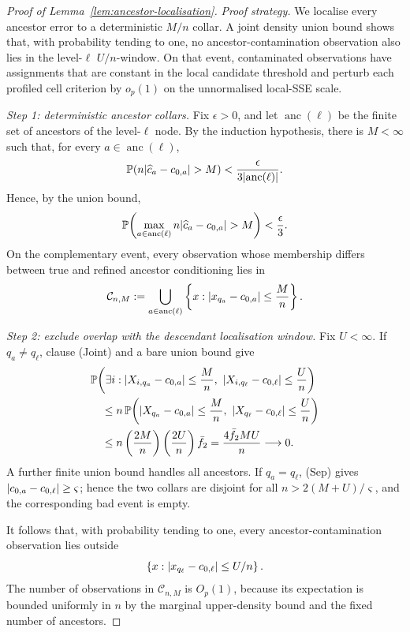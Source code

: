 \documentclass[11pt]{article}
\theoremstyle{plain}
\theoremstyle{definition}
\theoremstyle{remark}
\newcommand{\PP}{\mathbb{P}}
\DeclarePairedDelimiter{\abs}{\lvert}{\rvert}
\DeclarePairedDelimiter{\card}{\lvert}{\rvert}
\begin{document}
\begin{proof}[Proof of Lemma~\ref{lem:ancestor-localisation}]
\emph{Proof strategy.}
We localise every ancestor error to a deterministic \(M/n\) collar.  A joint
density union bound shows that, with probability tending to one, no
ancestor-contamination observation also lies in the level-\(\ell\)
\(U/n\)-window.  On that event, contaminated observations have assignments
that are constant in the local candidate threshold and perturb each profiled
cell criterion by \(o_p(1)\) on the unnormalised local-SSE scale.

\emph{Step 1: deterministic ancestor collars.}
Fix \(\epsilon>0\), and let
\(\operatorname{anc}(\ell)\) be the finite set of ancestors of the
level-\(\ell\) node.  By the induction hypothesis, there is \(M<\infty\) such
that, for every \(a\in\operatorname{anc}(\ell)\),
\[
  \PP\!\left(
    n\abs{\widehat c_a-c_{0,a}}>M
  \right)
  <
  \frac{\epsilon}
       {3\card{\operatorname{anc}(\ell)}}.
\]
Hence, by the union bound,
\[
  \PP\!\left(
    \max_{a\in\operatorname{anc}(\ell)}
    n\abs{\widehat c_a-c_{0,a}}>M
  \right)
  <\frac{\epsilon}{3}.
\]
On the complementary event, every observation whose membership differs
between true and refined ancestor conditioning lies in
\[
  \mathcal C_{n,M}
  :=
  \bigcup_{a\in\operatorname{anc}(\ell)}
  \left\{
    x:\abs{x_{q_a}-c_{0,a}}\le\frac{M}{n}
  \right\}.
\]

\emph{Step 2: exclude overlap with the descendant localisation window.}
Fix \(U<\infty\).  If \(q_a\ne q_\ell\), clause (Joint) and a bare union bound
give
\begin{align*}
  &\PP\!\left(
    \exists i:
    \abs{X_{i,q_a}-c_{0,a}}\le\frac{M}{n},
    \ 
    \abs{X_{i,q_\ell}-c_{0,\ell}}\le\frac{U}{n}
  \right)
  \\
  &\quad\le
  n\,
  \PP\!\left(
    \abs{X_{q_a}-c_{0,a}}\le\frac{M}{n},
    \ 
    \abs{X_{q_\ell}-c_{0,\ell}}\le\frac{U}{n}
  \right)
  \\
  &\quad\le
  n\left(\frac{2M}{n}\right)
       \left(\frac{2U}{n}\right)\bar f_2
  =
  \frac{4\bar f_2MU}{n}
  \longrightarrow0.
\end{align*}
A further finite union bound handles all ancestors.  If
\(q_a=q_\ell\), (Sep) gives
\(\abs{c_{0,a}-c_{0,\ell}}\ge\varsigma\); hence the two collars are disjoint
for all \(n>2(M+U)/\varsigma\), and the corresponding bad event is empty.

It follows that, with probability tending to one, every
ancestor-contamination observation lies outside
\[
  \left\{
    x:\abs{x_{q_\ell}-c_{0,\ell}}\le U/n
  \right\}.
\]
The number of observations in \(\mathcal C_{n,M}\) is \(O_p(1)\), because its
expectation is bounded uniformly in \(n\) by the marginal upper-density bound
and the fixed number of ancestors.


\end{proof}
\end{document}
